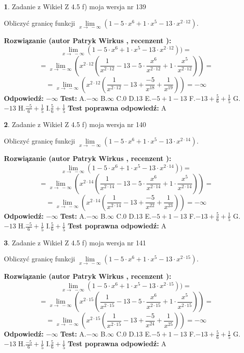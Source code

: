 \documentclass[12pt, a4paper]{article}
\theoremstyle{definition} %
\newtheorem{zad}{}
\newcommand{\zadStart}[1]{\begin{zad}#1\newline}
\newcommand{\zadStop}{\end{zad}}
\newcommand{\rozwStart}[2]{\noindent \textbf{Rozwiązanie (autor #1 , recenzent #2): }\newline}
\newcommand{\rozwStop}{\newline}
\newcommand{\odpStart}{\noindent \textbf{Odpowiedź:}\newline}
\newcommand{\odpStop}{\newline}
\newcommand{\testStart}{\noindent \textbf{Test:}\newline}
\newcommand{\testStop}{\newline}
\newcommand{\kluczStart}{\noindent \textbf{Test poprawna odpowiedź:}\newline}
\newcommand{\kluczStop}{\newline}
\begin{document}
\zadStart{Zadanie z Wikieł Z 4.5 f) moja wersja nr 139}



Obliczyć granicę funkcji  $\lim\limits_{x\to\ -\infty}(1 - 5 \cdot x^{6}+1 \cdot x^{5}- 13 \cdot x^{2\cdot12})$.
\zadStop
\rozwStart{Patryk Wirkus}{}
$$\lim\limits_{x\to\ -\infty}(1 - 5 \cdot x^{6}+1 \cdot x^{5}- 13 \cdot x^{2\cdot12}))=$$
$$=\lim\limits_{x\to\ -\infty}(x^{2\cdot12}(\frac{1}{x^{2\cdot12}}-13 -5 \cdot \frac{x^{6}}{x^{2\cdot12}}+1 \cdot \frac{x^{5}}{x^{2\cdot12}}))=$$
$$=\lim\limits_{x\to\ -\infty}(x^{2\cdot12}(\frac{1}{x^{2\cdot12}}-13 + \frac{-5}{x^{18}}+ \frac{1}{x^{19}}))=-\infty$$
\rozwStop
\odpStart
$-\infty$
\odpStop
\testStart
A.$-\infty$ B.$\infty$ C.$0$ D.$13$ E.$-5 + 1 - 13$
F.$-13+\frac{5}{6}+\frac{1}{5}$ G.$-13$
H.$\frac{-5}{6}+\frac{1}{5}$
I.$\frac{5}{6}+\frac{1}{5}$
\testStop
\kluczStart
A
\kluczStop



\zadStart{Zadanie z Wikieł Z 4.5 f) moja wersja nr 140}



Obliczyć granicę funkcji  $\lim\limits_{x\to\ -\infty}(1 - 5 \cdot x^{6}+1 \cdot x^{5}- 13 \cdot x^{2\cdot14})$.
\zadStop
\rozwStart{Patryk Wirkus}{}
$$\lim\limits_{x\to\ -\infty}(1 - 5 \cdot x^{6}+1 \cdot x^{5}- 13 \cdot x^{2\cdot14}))=$$
$$=\lim\limits_{x\to\ -\infty}(x^{2\cdot14}(\frac{1}{x^{2\cdot14}}-13 -5 \cdot \frac{x^{6}}{x^{2\cdot14}}+1 \cdot \frac{x^{5}}{x^{2\cdot14}}))=$$
$$=\lim\limits_{x\to\ -\infty}(x^{2\cdot14}(\frac{1}{x^{2\cdot14}}-13 + \frac{-5}{x^{22}}+ \frac{1}{x^{23}}))=-\infty$$
\rozwStop
\odpStart
$-\infty$
\odpStop
\testStart
A.$-\infty$ B.$\infty$ C.$0$ D.$13$ E.$-5 + 1 - 13$
F.$-13+\frac{5}{6}+\frac{1}{5}$ G.$-13$
H.$\frac{-5}{6}+\frac{1}{5}$
I.$\frac{5}{6}+\frac{1}{5}$
\testStop
\kluczStart
A
\kluczStop



\zadStart{Zadanie z Wikieł Z 4.5 f) moja wersja nr 141}



Obliczyć granicę funkcji  $\lim\limits_{x\to\ -\infty}(1 - 5 \cdot x^{6}+1 \cdot x^{5}- 13 \cdot x^{2\cdot15})$.
\zadStop
\rozwStart{Patryk Wirkus}{}
$$\lim\limits_{x\to\ -\infty}(1 - 5 \cdot x^{6}+1 \cdot x^{5}- 13 \cdot x^{2\cdot15}))=$$
$$=\lim\limits_{x\to\ -\infty}(x^{2\cdot15}(\frac{1}{x^{2\cdot15}}-13 -5 \cdot \frac{x^{6}}{x^{2\cdot15}}+1 \cdot \frac{x^{5}}{x^{2\cdot15}}))=$$
$$=\lim\limits_{x\to\ -\infty}(x^{2\cdot15}(\frac{1}{x^{2\cdot15}}-13 + \frac{-5}{x^{24}}+ \frac{1}{x^{25}}))=-\infty$$
\rozwStop
\odpStart
$-\infty$
\odpStop
\testStart
A.$-\infty$ B.$\infty$ C.$0$ D.$13$ E.$-5 + 1 - 13$
F.$-13+\frac{5}{6}+\frac{1}{5}$ G.$-13$
H.$\frac{-5}{6}+\frac{1}{5}$
I.$\frac{5}{6}+\frac{1}{5}$
\testStop
\kluczStart
A
\kluczStop
\end{document}
